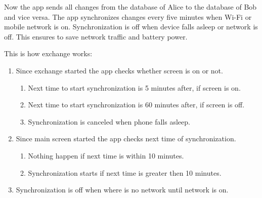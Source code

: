 \documentclass[a4paper,10pt,english]{sphinxmanual}
\begin{document}
\noindent{}
\noindent{}
\noindent{}
\noindent{}

Now the app sends all changes from the database of Alice to the database of Bob and vice versa.
The app synchronizes changes every five minutes when Wi-Fi or mobile network is on. Synchronization
is off when device falls asleep or network is off. This ensures to save network traffic and
battery power.

This is how exchange works:
\begin{enumerate}
\def\theenumi{\arabic{enumi}}
\def\labelenumi{\theenumi .}
\makeatletter\def\p@enumii{\p@enumi \theenumi .}\makeatother
\item {} 
Since exchange started the app checks whether screen is on or not.
\begin{enumerate}
\def\theenumii{\arabic{enumii}}
\def\labelenumii{\theenumii .}
\makeatletter\def\p@enumiii{\p@enumii \theenumii .}\makeatother
\item {} 
Next time to start synchronization is 5 minutes after, if screen is on.

\item {} 
Next time to start synchronization is 60 minutes after, if screen is off.

\item {} 
Synchronization is canceled when phone falls asleep.

\end{enumerate}

\item {} 
Since main screen started the app checks next time of synchronization.
\begin{enumerate}
\def\theenumii{\arabic{enumii}}
\def\labelenumii{\theenumii .}
\makeatletter\def\p@enumiii{\p@enumii \theenumii .}\makeatother
\item {} 
Nothing happen if next time is within 10 minutes.

\item {} 
Synchronization starts if next time is greater then 10 minutes.

\end{enumerate}

\item {} 
Synchronization is off when where is no network until network is on.

\end{enumerate}
\end{document}
